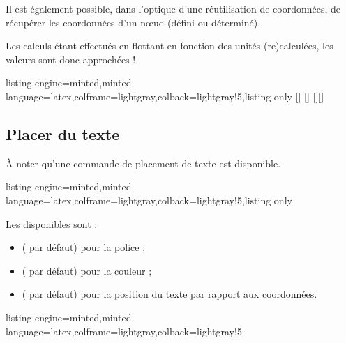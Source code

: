 \documentclass[11pt,a4paper]{ltxdoc}
\begin{document}
Il est également possible, dans l'optique d'une réutilisation de coordonnées, de récupérer les coordonnées d'un nœud (défini ou déterminé).

\smallskip

Les calculs étant effectués en flottant en fonction des unités (re)calculées, les valeurs sont donc approchées !

\begin{tcblisting}{listing engine=minted,minted language=latex,colframe=lightgray,colback=lightgray!5,listing only}
[\macrox]
[\macroy]
[\macrox][\macroy]
\end{tcblisting}

\subsection{Placer du texte}\label{placetxt}

À noter qu'une commande de placement de texte est disponible.

\begin{tcblisting}{listing engine=minted,minted language=latex,colframe=lightgray,colback=lightgray!5,listing only}
\end{tcblisting}

Les \MontreCode{[clés]} disponibles sont :

\begin{itemize}
	\item {} ( par défaut) pour la police ;
	\item {} ( par défaut) pour la couleur ;
	\item {} ( par défaut) pour la position du texte par rapport aux coordonnées.
\end{itemize}

\begin{tcblisting}{listing engine=minted,minted language=latex,colframe=lightgray,colback=lightgray!5}
	\begin{GraphiqueTikz}[x=1cm,y=1cm,Xmin=0,Xmax=5,Ymin=0,Ymax=1]
	\end{GraphiqueTikz}
\end{tcblisting}
\end{document}
